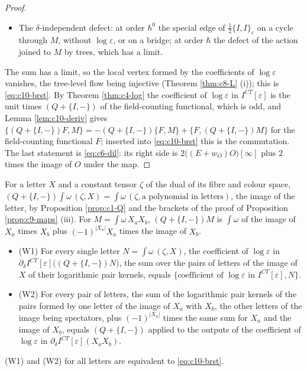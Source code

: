 \begin{proof}
\begin{itemize}
\item The $\delta$-independent defect: at order $\hbar^0$ the special edge of $\tfrac12\{I,I\}_\varepsilon$ on a cycle through $M$, without $\log\varepsilon$, or on a bridge; at order $\hbar$ the defect of the action joined to $M$ by trees, which has a limit.
\end{itemize}
The sum has a limit, so the local vertex formed by the coefficients of $\log\varepsilon$ vanishes, the tree-level flow being injective (Theorem \ref{thm:c8-L} (i)); this is \eqref{eq:c10-brst}. By Theorem \ref{thm:c4-log} the coefficient of $\log\varepsilon$ in $I^{CT}[\varepsilon]$ is the unit times $(Q+\{I,-\})$ of the field-counting functional, which is odd, and Lemma \ref{lem:c10-deriv} gives $\{(Q+\{I,-\})F,M\}=-(Q+\{I,-\})\{F,M\}+\{F,(Q+\{I,-\})M\}$ for the field-counting functional $F$; inserted into \eqref{eq:c10-brst} this is the commutation. The last statement is \eqref{eq:c6-dil}: its right side is $2\big((E+w_O)O\big)[\infty]$ plus $2$ times the image of $O$ under the map.
\end{proof}

For a letter $X$ and a constant tensor $\zeta$ of the dual of its fibre and colour space, $(Q+\{I,-\})\int\omega\,(\zeta,X)=\int\omega\,(\zeta,\text{a polynomial in letters})$, the image of the letter, by Proposition \ref{prop:c1-Q} and the brackets of the proof of Proposition \ref{prop:c9-maps} (iii). For $M=\int\omega\,X_aX_b$, $(Q+\{I,-\})M$ is $\int\omega$ of the image of $X_a$ times $X_b$ plus $(-1)^{|X_a|}X_a$ times the image of $X_b$.

\begin{corollary}
\label{cor:c10-ward}
\begin{itemize}
\item (W1) For every single letter $N=\int\omega\,(\zeta,X)$, the coefficient of $\log\varepsilon$ in $\partial_\delta I^{CT}[\varepsilon]\big((Q+\{I,-\})N\big)$, the sum over the pairs of letters of the image of $X$ of their logarithmic pair kernels, equals $\{\text{coefficient of }\log\varepsilon\text{ in }I^{CT}[\varepsilon],N\}$.
\item (W2) For every pair of letters, the sum of the logarithmic pair kernels of the pairs formed by one letter of the image of $X_a$ with $X_b$, the other letters of the image being spectators, plus $(-1)^{|X_a|}$ times the same sum for $X_a$ and the image of $X_b$, equals $(Q+\{I,-\})$ applied to the outputs of the coefficient of $\log\varepsilon$ in $\partial_\delta I^{CT}[\varepsilon](X_aX_b)$.
\end{itemize}
(W1) and (W2) for all letters are equivalent to \eqref{eq:c10-brst}.
\end{corollary}

